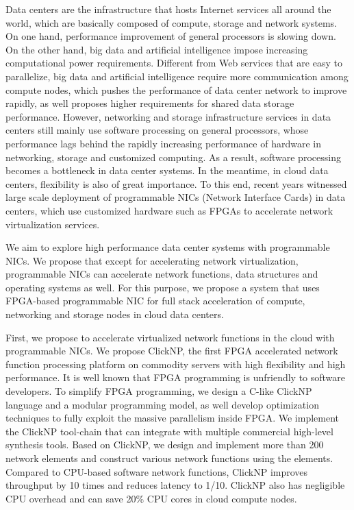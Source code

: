 \begin{enabstract}
	
Data centers are the infrastructure that hosts Internet services all around the world, which are basically composed of compute, storage and network systems.
On one hand, performance improvement of general processors is slowing down.
On the other hand, big data and artificial intelligence impose increasing computational power requirements.
Different from Web services that are easy to parallelize, big data and artificial intelligence require more communication among compute nodes, which pushes the performance of data center network to improve rapidly, as well proposes higher requirements for shared data storage performance.
However, networking and storage infrastructure services in data centers still mainly use software processing on general processors, whose performance lags behind the rapidly increasing performance of hardware in networking, storage and customized computing.
As a result, software processing becomes a bottleneck in data center systems.
In the meantime, in cloud data centers, flexibility is also of great importance.
To this end, recent years witnessed large scale deployment of programmable NICs (Network Interface Cards) in data centers, which use customized hardware such as FPGAs to accelerate network virtualization services.

We aim to explore high performance data center systems with programmable NICs.
We propose that except for accelerating network virtualization, programmable NICs can accelerate network functions, data structures and operating systems as well.
For this purpose, we propose a system that uses FPGA-based programmable NIC for full stack acceleration of compute, networking and storage nodes in cloud data centers.

First, we propose to accelerate virtualized network functions in the cloud with programmable NICs. We propose ClickNP, the first FPGA accelerated network function processing platform on commodity servers with high flexibility and high performance.
It is well known that FPGA programming is unfriendly to software developers.
To simplify FPGA programming, we design a C-like ClickNP language and a modular programming model, as well develop optimization techniques to fully exploit the massive parallelism inside FPGA.
We implement the ClickNP tool-chain that can integrate with multiple commercial high-level synthesis tools.
Based on ClickNP, we design and implement more than 200 network elements and construct various network functions using the elements.
Compared to CPU-based software network functions, ClickNP improves throughput by 10 times and reduces latency to 1/10.
ClickNP also has negligible CPU overhead and can save 20\% CPU cores in cloud compute nodes.


\end{enabstract}
